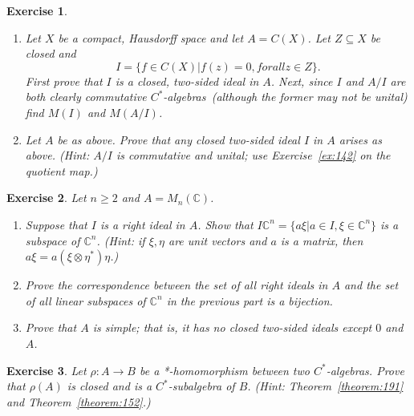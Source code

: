 \documentclass{book}
\newtheorem{exercise}{Exercise}[section]
\def\cstars{\(C^*\)-algebras}
\begin{document}
\begin{exercise}
  \begin{enumerate}
    \item Let \(X\) be a compact, Hausdorff space and let \(A = C(X)\). Let \(Z \subseteq X\) be closed and
    \[I =\{f \in C(X)|f(z) = 0, for all z \in Z\}.\]
    First prove that \(I\) is a closed, two-sided ideal in \(A\). Next, since \(I\) and
    \(A/I\) are both clearly commutative \cstars\ (although the former may
    not be unital) find \(M(I)\) and \(M(A/I)\).
    \item Let \(A\) be as above. Prove that any closed two-sided ideal \(I\) in \(A\) arises
    as above. (Hint: \(A/I\) is commutative and unital; use Exercise~\ref{ex:142} on
    the quotient map.)
  \end{enumerate}
\end{exercise}
\begin{exercise}\label{ex:192}
  Let \(n \geq 2\) and \(A = M_n(\mathbb{C})\).
  \begin{enumerate}
    \item Suppose that \(I\) is a right ideal in \(A\). Show that \(I\mathbb{C}^n = \{a\xi | a \in I,\xi \in \mathbb{C}^n\}\) 
      is a subspace of \(\mathbb{C}^n\). (Hint: if \(\xi,\eta\) are unit vectors and \(a\) is a
      matrix, then \(a\xi = a(\xi \otimes \eta^*)\eta\).)
    \item Prove the correspondence between the set of all right ideals in \(A\) and
      the set of all linear subspaces of \(\mathbb{C}^n\) in the previous part is a bijection.
    \item Prove that \(A\) is simple; that is, it has no closed two-sided ideals except
      \(0\) and \(A\).
  \end{enumerate}
\end{exercise}
\begin{exercise}
  Let \(\rho : A \rightarrow B\) be a *-homomorphism between two \cstars. 
  Prove that \(\rho(A)\) is closed and is a \(C^*\)-subalgebra of \(B\). (Hint:
  Theorem~\ref{theorem:191} and Theorem~\ref{theorem:152}.)
\end{exercise}
\end{document}
